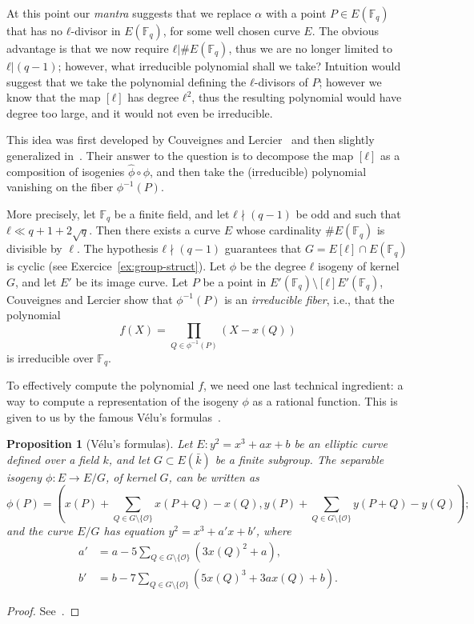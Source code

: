 \documentclass[10pt]{article}
\theoremstyle{plain}
\newtheorem{proposition}[theorem]{Proposition}
\theoremstyle{definition}
\def\F{\ensuremath{\mathbb{F}}}
\def\O{\ensuremath{\mathcal{O}}}
\begin{document}
At this point our \emph{mantra} suggests that we replace $α$ with a
point $P∈E(\F_q)$ that has no $ℓ$-divisor in $E(\F_q)$, for some well
chosen curve $E$. %
The obvious advantage is that we now require $ℓ|\#E(\F_q)$, thus we
are no longer limited to $ℓ|(q-1)$; however, what irreducible
polynomial shall we take? %
Intuition would suggest that we take the polynomial defining the
$ℓ$-divisors of $P$; however we know that the map $[ℓ]$ has degree
$ℓ^2$, thus the resulting polynomial would have degree too large, and
it would not even be irreducible.

This idea was first developed by Couveignes and
Lercier~\cite{couveignes+lercier11} and then slightly generalized
in~\cite{DeDoSc13}. %
Their answer to the question is to decompose the map $[ℓ]$ as a
composition of isogenies $\hat{ϕ}∘ϕ$, and then take the (irreducible)
polynomial vanishing on the fiber $ϕ^{-1}(P)$.

More precisely, let $\F_q$ be a finite field, and let $ℓ\nmid(q-1)$ be
odd and such that $ℓ\ll q+1+2\sqrt{q}$. %
Then there exists a curve $E$ whose cardinality $\#E(\F_q)$ is
divisible by $\ell$. %
The hypothesis $ℓ\nmid(q-1)$ guarantees that $G = E[ℓ]∩E(\F_q)$ is
cyclic (see Exercice~\ref{ex:group-struct}). %
Let $ϕ$ be the degree $ℓ$ isogeny of kernel $G$, and let $E'$ be its
image curve. %
Let $P$ be a point in $E'(\F_q)\setminus [ℓ]E'(\F_q)$, Couveignes and
Lercier show that $\phi^{-1}(P)$ is an \emph{irreducible fiber}, i.e.,
that the polynomial
\[f(X) = \prod_{Q\in\phi^{-1}(P)}(X - x(Q))\]
is irreducible over $\F_q$.

To effectively compute the polynomial $f$, we need one last technical
ingredient: a way to compute a representation of the isogeny $ϕ$ as a
rational function. %
This is given to us by the famous V\'elu's formulas~\cite{velu71}.

\begin{proposition}[V\'elu's formulas]
  \label{th:velu}
  Let $E:y^2=x^3+ax+b$ be an elliptic curve defined over a field $k$,
  and let $G⊂E(\bar{k})$ be a finite subgroup. %
  The separable isogeny $ϕ:E\to E/G$, of kernel $G$, can be written as
  \begin{equation*}
    ϕ(P) = \left(
      x(P) + \sum_{Q∈G\setminus\{\O\}}x(P+Q)-x(Q),
      y(P) + \sum_{Q∈G\setminus\{\O\}}y(P+Q)-y(Q)
    \right);
  \end{equation*} %
  and the curve $E/G$ has equation $y^2=x^3+a'x+b'$, where
  \begin{align*}
    a' &= a - 5\sum_{Q∈G\setminus\{\O\}}(3x(Q)^2+a),\\
    b' &= b - 7\sum_{Q∈G\setminus\{\O\}}(5x(Q)^3+3ax(Q)+b).
  \end{align*}
\end{proposition}
\begin{proof}
  See~\cite[\S8.2]{df+thesis}.
\end{proof}
\end{document}
